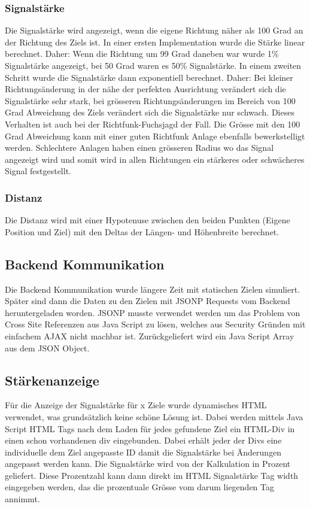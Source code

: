 \subsubsection{Signalstärke} %
\label{ssub:signalstärke}
Die Signalstärke wird angezeigt, wenn die eigene Richtung näher als 100 Grad an der Richtung des Ziels ist. In einer ersten Implementation wurde die Stärke linear berechnet. Daher: Wenn die Richtung um 99 Grad daneben war wurde 1\% Signalstärke angezeigt, bei 50 Grad waren es 50\% Signalstärke. In einem zweiten Schritt wurde die Signalstärke dann exponentiell berechnet. Daher: Bei kleiner Richtungsänderung in der nähe der perfekten Ausrichtung verändert sich die Signalstärke sehr stark, bei grösseren Richtungsänderungen im Bereich von 100 Grad Abweichung des Ziels verändert sich die Signalstärke nur schwach. Dieses Verhalten ist auch bei der Richtfunk-Fuchsjagd der Fall. Die Grösse mit den 100 Grad Abweichung kann mit einer guten Richtfunk Anlage ebenfalls bewerkstelligt werden. Schlechtere Anlagen haben einen grösseren Radius wo das Signal angezeigt wird und somit wird in allen Richtungen ein stärkeres oder schwächeres Signal festgestellt.
\subsubsection{Distanz} %
\label{ssub:distanz}
Die Distanz wird mit einer Hypotenuse zwischen den beiden Punkten (Eigene Position und Ziel) mit den Deltas der Längen- und Höhenbreite berechnet. 

\subsection{Backend Kommunikation} %
\label{sub:backend_kommunikation}
Die Backend Kommunikation wurde längere Zeit mit statischen Zielen simuliert. Später sind dann die Daten zu den Zielen mit JSONP Requests vom Backend heruntergeladen worden. JSONP musste verwendet werden um das Problem von Cross Site Referenzen aus Java Script zu lösen, welches aus Security Gründen mit einfachem AJAX nicht machbar ist. Zurückgeliefert wird ein Java Script Array aus dem JSON Object.

\subsection{Stärkenanzeige} %
\label{sub:stärkenanzeige}
Für die Anzeige der Signalstärke für x Ziele wurde dynamisches HTML verwendet, was grundsätzlich keine schöne Lösung ist. Dabei werden mittels Java Script HTML Tags nach dem Laden für jedes gefundene Ziel ein HTML-Div in einen schon vorhandenen div eingebunden. Dabei erhält jeder der Divs eine individuelle dem Ziel angepasste ID damit die Signalstärke bei Änderungen angepasst werden kann. Die Signalstärke wird von der Kalkulation in Prozent geliefert. Diese Prozentzahl kann dann direkt im HTML Signalstärke Tag width eingegeben werden, das die prozentuale Grösse vom darum liegenden Tag annimmt.

